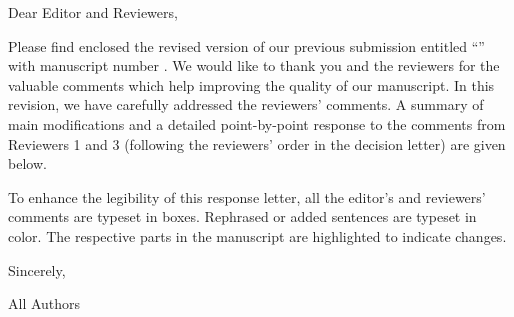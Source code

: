 \thispagestyle{empty}
\noindent Dear Editor and Reviewers,

Please find enclosed the revised version of our previous submission entitled \enquote{\thetitle} with manuscript number \manuscript. We would like to thank you and the reviewers for the valuable comments which help improving the quality of our manuscript.
In this revision, we have carefully addressed the reviewers' comments. A summary of main modifications and a detailed point-by-point response to the comments from Reviewers 1 and 3 (following the reviewers' order in the decision letter) are given below.

To enhance the legibility of this response letter, all the editor's and reviewers' comments are typeset in boxes. Rephrased or added sentences are typeset in color. The respective parts in the manuscript are highlighted to indicate changes.

\vspace{1em}

\noindent Sincerely,

\noindent All Authors

\tableofcontents

